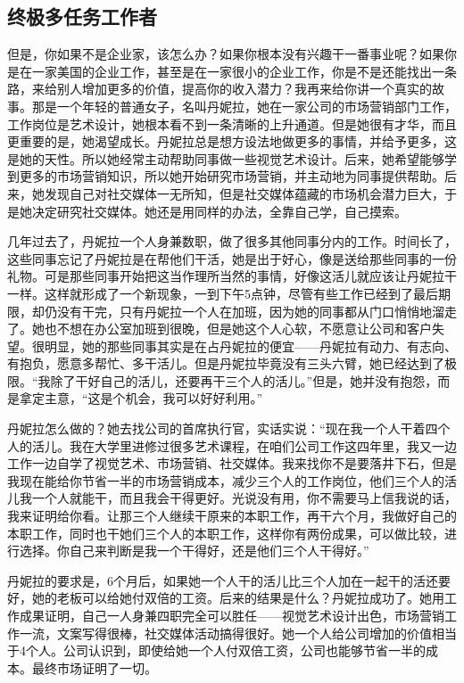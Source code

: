 \subsection{终极多任务工作者}

但是，你如果不是企业家，该怎么办？如果你根本没有兴趣干一番事业呢？如果你是在一家美国的企业工作，甚至是在一家很小的企业工作，你是不是还能找出一条路，来给别人增加更多的价值，提高你的收入潜力？我再来给你讲一个真实的故事。那是一个年轻的普通女子，名叫丹妮拉，她在一家公司的市场营销部门工作，工作岗位是艺术设计，她根本看不到一条清晰的上升通道。但是她很有才华，而且更重要的是，她渴望成长。丹妮拉总是想方设法地做更多的事情，并给予更多，这是她的天性。所以她经常主动帮助同事做一些视觉艺术设计。后来，她希望能够学到更多的市场营销知识，所以她开始研究市场营销，并主动地为同事提供帮助。后来，她发现自己对社交媒体一无所知，但是社交媒体蕴藏的市场机会潜力巨大，于是她决定研究社交媒体。她还是用同样的办法，全靠自己学，自己摸索。

几年过去了，丹妮拉一个人身兼数职，做了很多其他同事分内的工作。时间长了，这些同事忘记了丹妮拉是在帮他们干活，她是出于好心，像是送给那些同事的一份礼物。可是那些同事开始把这当作理所当然的事情，好像这活儿就应该让丹妮拉干一样。这样就形成了一个新现象，一到下午5点钟，尽管有些工作已经到了最后期限，却仍没有干完，只有丹妮拉一个人在加班，因为她的同事都从门口悄悄地溜走了。她也不想在办公室加班到很晚，但是她这个人心软，不愿意让公司和客户失望。很明显，她的那些同事其实是在占丹妮拉的便宜——丹妮拉有动力、有志向、有抱负，愿意多帮忙、多干活儿。但是丹妮拉毕竟没有三头六臂，她已经达到了极限。“我除了干好自己的活儿，还要再干三个人的活儿。”但是，她并没有抱怨，而是拿定主意，“这是个机会，我可以好好利用。”

丹妮拉怎么做的？她去找公司的首席执行官，实话实说：“现在我一个人干着四个人的活儿。我在大学里进修过很多艺术课程，在咱们公司工作这四年里，我又一边工作一边自学了视觉艺术、市场营销、社交媒体。我来找你不是要落井下石，但是我现在能给你节省一半的市场营销成本，减少三个人的工作岗位，他们三个人的活儿我一个人就能干，而且我会干得更好。光说没有用，你不需要马上信我说的话，我来证明给你看。让那三个人继续干原来的本职工作，再干六个月，我做好自己的本职工作，同时也干她们三个人的本职工作，这样你有两份成果，可以做比较，进行选择。你自己来判断是我一个干得好，还是他们三个人干得好。”

丹妮拉的要求是，6个月后，如果她一个人干的活儿比三个人加在一起干的活还要好，她的老板可以给她付双倍的工资。后来的结果是什么？丹妮拉成功了。她用工作成果证明，自己一人身兼四职完全可以胜任——视觉艺术设计出色，市场营销工作一流，文案写得很棒，社交媒体活动搞得很好。她一个人给公司增加的价值相当于4个人。公司认识到，即使给她一个人付双倍工资，公司也能够节省一半的成本。最终市场证明了一切。

